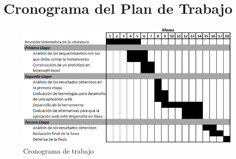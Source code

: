 
\section{Cronograma del Plan de Trabajo}

	\begin{figure}[H]
		\centering
		\includegraphics[width=1\linewidth,keepaspectratio]{./img/cronograma}
		\caption{Cronograma de trabajo}
		\label{fig:cronograma}
	\end{figure}